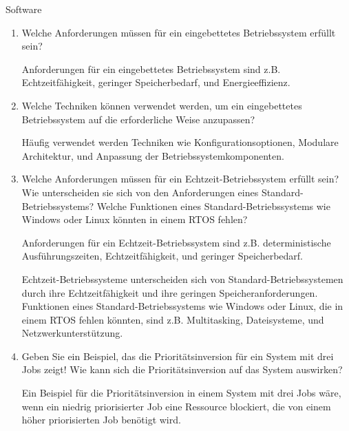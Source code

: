 \documentclass{article}
\begin{document}
\begin{exercise}{Software}
  \begin{enumerate}
    \item Welche Anforderungen müssen für ein eingebettetes Betriebssystem erfüllt sein?

          \begin{solution}
            Anforderungen für ein eingebettetes Betriebssystem sind z.B. Echtzeitfähigkeit, geringer Speicherbedarf, und Energieeffizienz.
          \end{solution}

    \item Welche Techniken können verwendet werden, um ein eingebettetes Betriebssystem auf die erforderliche Weise anzupassen?

          \begin{solution}
            Häufig verwendet werden Techniken wie Konfigurationsoptionen, Modulare Architektur, und Anpassung der Betriebssystemkomponenten.
          \end{solution}

    \item Welche Anforderungen müssen für ein Echtzeit-Betriebssystem erfüllt sein? Wie unterscheiden sie sich von den Anforderungen eines Standard-Betriebssystems? Welche Funktionen eines Standard-Betriebssystems wie Windows oder Linux könnten in einem RTOS fehlen?

          \begin{solution}
            Anforderungen für ein Echtzeit-Betriebssystem sind z.B. deterministische Ausführungszeiten, Echtzeitfähigkeit, und geringer Speicherbedarf.

            Echtzeit-Betriebssysteme unterscheiden sich von Standard-Betriebssystemen durch ihre Echtzeitfähigkeit und ihre geringen Speicheranforderungen. Funktionen eines Standard-Betriebssystems wie Windows oder Linux, die in einem RTOS fehlen könnten, sind z.B. Multitasking, Dateisysteme, und Netzwerkunterstützung.
          \end{solution}

    \item Geben Sie ein Beispiel, das die Prioritätsinversion für ein System mit drei Jobs zeigt! Wie kann sich die Prioritätsinversion auf das System auswirken?

          \begin{solution}
            Ein Beispiel für die Prioritätsinversion in einem System mit drei Jobs wäre, wenn ein niedrig priorisierter Job eine Ressource blockiert, die von einem höher priorisierten Job benötigt wird.


\end{solution}
\end{enumerate}
\end{exercise}
\end{document}
